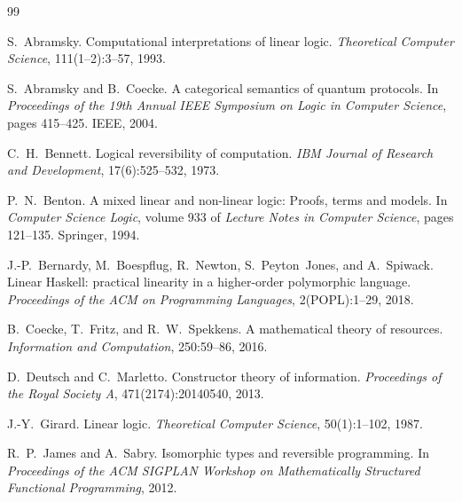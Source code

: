 \documentclass[11pt,a4paper]{article}
\begin{document}
\begin{thebibliography}{99}

S.~Abramsky.
\newblock Computational interpretations of linear logic.
\newblock \emph{Theoretical Computer Science}, 111(1--2):3--57, 1993.

S.~Abramsky and B.~Coecke.
\newblock A categorical semantics of quantum protocols.
\newblock In \emph{Proceedings of the 19th Annual IEEE Symposium on Logic in
  Computer Science}, pages 415--425. IEEE, 2004.

C.~H.~Bennett.
\newblock Logical reversibility of computation.
\newblock \emph{IBM Journal of Research and Development}, 17(6):525--532, 1973.

P.~N.~Benton.
\newblock A mixed linear and non-linear logic: Proofs, terms and models.
\newblock In \emph{Computer Science Logic}, volume 933 of \emph{Lecture Notes
  in Computer Science}, pages 121--135. Springer, 1994.

J.-P.~Bernardy, M.~Boespflug, R.~Newton, S.~Peyton~Jones, and A.~Spiwack.
\newblock Linear {Haskell}: practical linearity in a higher-order polymorphic
  language.
\newblock \emph{Proceedings of the ACM on Programming Languages},
  2(POPL):1--29, 2018.

B.~Coecke, T.~Fritz, and R.~W.~Spekkens.
\newblock A mathematical theory of resources.
\newblock \emph{Information and Computation}, 250:59--86, 2016.

D.~Deutsch and C.~Marletto.
\newblock Constructor theory of information.
\newblock \emph{Proceedings of the Royal Society A}, 471(2174):20140540, 2013.

J.-Y.~Girard.
\newblock Linear logic.
\newblock \emph{Theoretical Computer Science}, 50(1):1--102, 1987.

R.~P.~James and A.~Sabry.
\newblock Isomorphic types and reversible programming.
\newblock In \emph{Proceedings of the ACM SIGPLAN Workshop on Mathematically
  Structured Functional Programming}, 2012.


\end{thebibliography}
\end{document}
